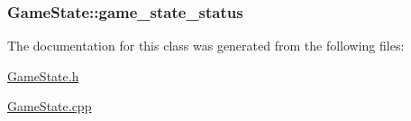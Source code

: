 \subsubsection[{game\+\_\+state\+\_\+status}]{ Game\+State\+::game\+\_\+state\+\_\+status\hspace{0.3cm}{\ttfamily [private]}}\label{class_game_state_a20c5da806fef9e342e3c9baefc1e94b0}


The documentation for this class was generated from the following files\+:\begin{DoxyCompactItemize}
\item 
\hyperlink{_game_state_8h}{Game\+State.\+h}\item 
\hyperlink{_game_state_8cpp}{Game\+State.\+cpp}\end{DoxyCompactItemize}
